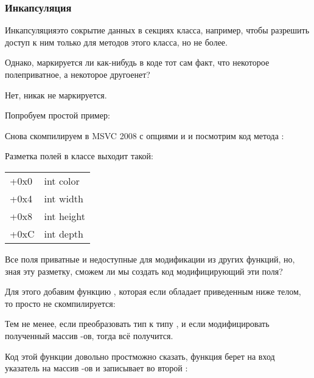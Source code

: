 \subsubsection{Инкапсуляция}

Инкапсуляция\EMDASH{}это сокрытие данных в  секциях класса, например, чтобы разрешить доступ к ним только 
для методов этого класса, но не более.

Однако, маркируется ли как-нибудь в коде тот сам факт, что некоторое поле\EMDASH{}приватное, 
а некоторое другое\EMDASH{}нет?

Нет, никак не маркируется.

Попробуем простой пример:



Снова скомпилируем в MSVC 2008 с опциями \Ox и \Obzero и посмотрим код метода :



Разметка полей в классе выходит такой:

\begin{center}
\begin{tabular}{ | l | l | }
\hline
  \tableheader{} \\
\hline
  +0x0 & int color \\
\hline
  +0x4 & int width \\
\hline
  +0x8 & int height \\
\hline
  +0xC & int depth \\
\hline
\end{tabular}
\end{center}

Все поля приватные и недоступные для модификации из других функций, но, зная эту разметку, 
сможем ли мы создать код модифицирующий эти поля? 

Для этого добавим функцию , которая если обладает 
приведенным ниже телом, то просто не скомпилируется:



Тем не менее, если преобразовать тип  к типу , 
и если модифицировать полученный массив \Tint{}-ов, тогда всё получится.



Код этой функции довольно прост\EMDASH{}можно сказать, функция берет на вход указатель на массив \Tint{}-ов и 
записывает  во второй \Tint{}:

